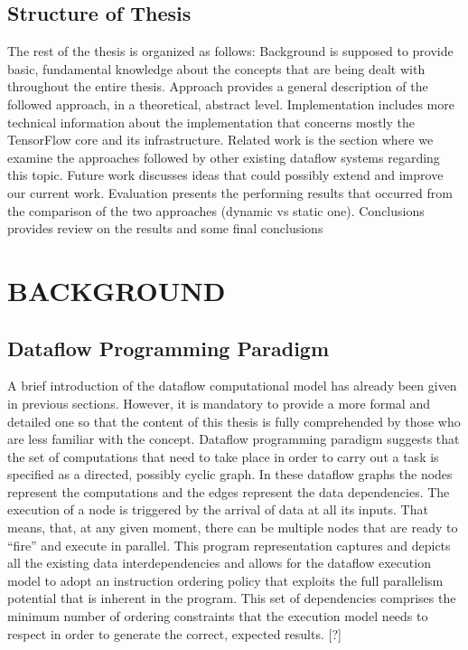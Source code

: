 \documentclass[ack,preface]{dithesis}
\begin{document}
    \section{Structure of Thesis}
The rest of the thesis is organized as follows:
Background is supposed to provide basic, fundamental knowledge about the concepts that are being dealt with throughout the entire thesis.
Approach provides a general description of the followed approach, in a theoretical, abstract level.
Implementation includes more technical information about the implementation that concerns mostly the TensorFlow core and its infrastructure.
Related work is the section where we examine the approaches followed by other existing dataflow systems regarding this topic.
Future work discusses ideas that could possibly extend and improve our current work.
Evaluation presents the performing results that occurred from the comparison of the two approaches (dynamic vs static one).
Conclusions provides review on the results and some final conclusions


\chapter{BACKGROUND}
    \section{Dataflow Programming Paradigm}
A brief introduction of the dataflow computational model has already been given in previous sections. However, it is mandatory to provide a more formal and detailed one so that the content of this thesis is fully comprehended by those who are less familiar with the concept.
Dataflow programming paradigm suggests that the set of computations that need to take place in order to carry out a task is specified as a directed, possibly cyclic graph. In these dataflow graphs the nodes represent the computations and the edges represent the data dependencies. The execution of a node is triggered by the arrival of data at all its inputs. That means, that, at any given moment, there can be multiple nodes that are ready to “fire” and execute in parallel. This program representation captures and depicts all the existing data interdependencies and allows for the dataflow execution model to adopt an instruction ordering policy that exploits the full parallelism potential that is inherent in the program. This set of dependencies comprises the minimum number of ordering constraints that the execution model needs to respect in order to generate the correct, expected results. [?]
\end{document}
